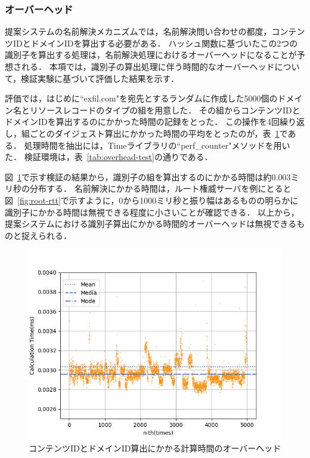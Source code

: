 \newpage
\subsubsection{オーバーヘッド}
提案システムの名前解決メカニズムでは，名前解決問い合わせの都度，コンテンツIDとドメインIDを算出する必要がある．
ハッシュ関数に基づいたこの2つの識別子を算出する処理は，名前解決処理におけるオーバーヘッドになることが予想される．
本項では，識別子の算出処理に伴う時間的なオーバーヘッドについて，検証実験に基づいて評価した結果を示す．

評価では，はじめに``exfil.com"を宛先とするランダムに作成した5000個のドメイン名とリソースレコードのタイプの組を用意した．
その組からコンテンツIDとドメインIDを算出するのにかかった時間の記録をとった．
この操作を4回繰り返し，組ごとのダイジェスト算出にかかった時間の平均をとったのが，表~\ref{fig:overhead}である．
処理時間を抽出には，Timeライブラリの``perf\_counter"メソッドを用いた．
検証環境は，表~\ref{tab:overhead-test}の通りである．



図~\ref{fig:overhead}で示す検証の結果から，識別子の組を算出するのにかかる時間は約0.003ミリ秒の分布する．
名前解決にかかる時間は，ルート権威サーバを例にとると図~\ref{fig:root-rtt}で示すように，0から1000ミリ秒と振り幅はあるものの明らかに識別子にかかる時間は無視できる程度に小さいことが確認できる．
以上から，提案システムにおける識別子算出にかかる時間的オーバーヘッドは無視できるものと捉えられる．

\begin{figure}[h]
 \centering
 \includegraphics[scale=0.8]{figure/overhead.png}
 \caption[識別子導出にかかる時間的オーバーヘッド]{コンテンツIDとドメインID算出にかかる計算時間のオーバーヘッド}
 \label{fig:overhead}
\end{figure}


